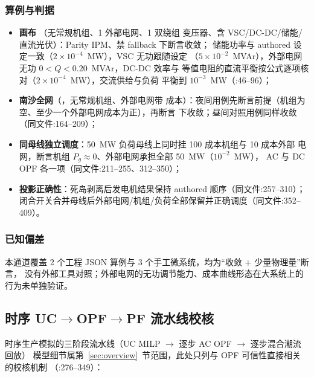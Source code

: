 \subsubsection*{算例与判据}
\begin{itemize}
  \item \textbf{画布 }（无常规机组、1 外部电网、1 双绕组
        变压器、含 VSC/DC-DC/储能/直流光伏）：Parity IPM、禁 fallback 下断言收敛；
        储能功率与 authored 设定一致（$2\times10^{-4}$~MW），VSC 无功跟随设定
        （$5\times10^{-2}$~MVAr），外部电网无功 $0<Q<0.20$~MVAr，DC-DC 效率与
        等值电阻的直流平衡按公式逐项核对（$2\times10^{-4}$~MW），交流供给与负荷
        平衡到 $10^{-3}$~MW（:46--96）；
  \item \textbf{南沙全网}（，无常规机组、外部电网带
        成本）：夜间用例先断言前提（机组为空、至少一个外部电网成本为正），再断言
         下收敛；昼间对照用例同样收敛（同文件:164--209）；
  \item \textbf{同母线独立调度}：50~MW 负荷母线上同时挂 100 成本机组与 10 成本外部
        电网，断言机组 $P_g\approx0$、外部电网承担全部 50~MW（$10^{-2}$~MW），
        AC 与 DC OPF 各一项（同文件:211--255、312--350）；
  \item \textbf{投影正确性}：死岛剥离后发电机结果保持 authored 顺序（同文件:257--310）；
        闭合开关合并母线后外部电网/机组/负荷全部保留并正确调度（同文件:352--409）。
\end{itemize}

\subsubsection*{已知偏差}
本通道覆盖 2 个工程 JSON 算例与 3 个手工微系统，均为“收敛 + 少量物理量”断言，
没有外部工具对照；外部电网的无功调节能力、成本曲线形态在大系统上的行为未单独验证。

\subsection{时序 UC$\to$OPF$\to$PF 流水线校核}\label{subsec:ver:tspf}

时序生产模拟的三阶段流水线（UC MILP $\to$ 逐步 AC OPF $\to$ 逐步混合潮流回放）
模型细节属第~\ref{sec:overview}~节范围，此处只列与 OPF 可信性直接相关的校核机制
（:276--349）：

